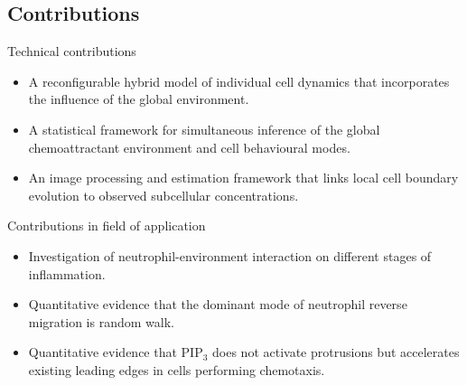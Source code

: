 \documentclass[mathserif,11pt]{beamer}
\begin{document}
\subsection{Contributions}
\begin{frame}{Technical contributions}
\begin{itemize}
	\item A reconfigurable hybrid model of individual cell dynamics that incorporates the influence of the global  environment.
	\item A statistical framework for simultaneous inference of the global chemoattractant environment and cell behavioural modes.
	\item An image processing and estimation framework that links local cell boundary evolution to observed subcellular concentrations.
\end{itemize}
\end{frame}
\begin{frame}{Contributions in field of application}
\begin{itemize}
	\item Investigation of neutrophil-environment interaction on different stages of inflammation.
	\item Quantitative evidence that the dominant mode of neutrophil reverse migration is random walk.
	\item Quantitative evidence that PIP$_3$ does not activate protrusions but accelerates existing leading edges in cells performing chemotaxis.
\end{itemize}
\end{frame}
\end{document}
